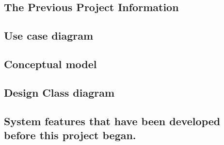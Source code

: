 \documentclass[12pt, a4paper]{article}
\begin{document}
\begin{CJK*}{UTF8}{bkai}
\section{The Previous Project Information}
  \subsection{Use case diagram}

  \subsection{Conceptual model}

  \subsection{Design Class diagram}

  \subsection{System features that have been developed before this project began.}
\end{CJK*}
\end{document}
